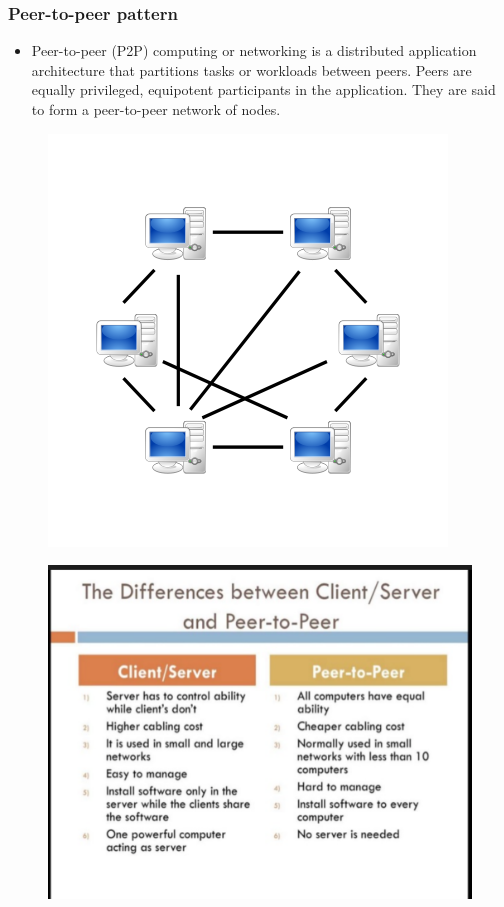 \documentclass[a4paper]{article}
\begin{document}
\subsubsection{Peer-to-peer pattern}
\begin{itemize}
\item Peer-to-peer (P2P) computing or networking is a distributed application architecture that partitions tasks or workloads between peers. Peers are equally privileged, equipotent participants in the application. They are said to form a peer-to-peer network of nodes.
\end{itemize}

\begin{figure}[h]
\centering 
\includegraphics[scale=0.5]{images/p2p.png}
\end{figure}

\begin{figure}[h]
\centering 
\includegraphics[scale=0.5]{images/csvsp2p.png}
\end{figure}
\end{document}
